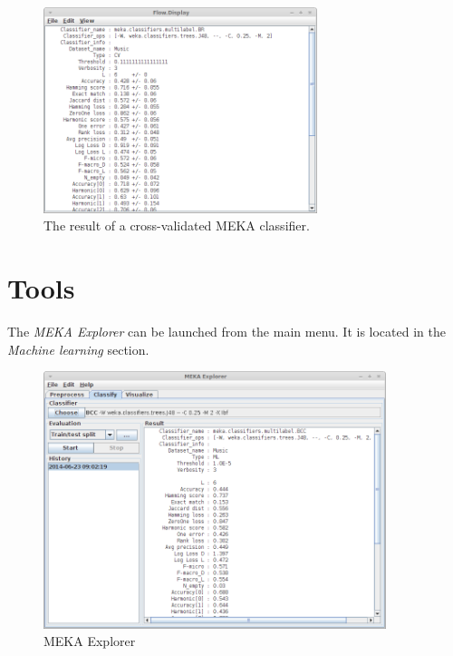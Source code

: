 \documentclass[a4paper]{book}
\begin{document}
\begin{figure}[htb]
  \centering
  \includegraphics[width=8.0cm]{images/crossvalidate-output.png}
  \caption{The result of a cross-validated MEKA classifier.}
  \label{crossvalidate-output}
\end{figure}

\chapter{Tools}
The \textit{MEKA Explorer} can be launched from the main menu. It is located
in the \textit{Machine learning} section.

\begin{figure}[htb]
  \centering
  \includegraphics[width=10.0cm]{images/explorer.png}
  \caption{MEKA Explorer}
  \label{explorer}
\end{figure}



\end{document}
